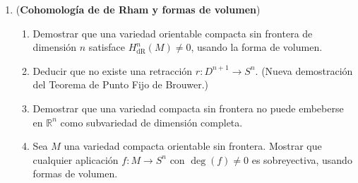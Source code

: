 \documentclass[11pt,a4paper]{article}
\theoremstyle{plain}
\theoremstyle{definition}
\theoremstyle{remark}
\newcommand{\RR}{\mathbb R}
\begin{document}
\begin{enumerate}[label=\arabic*.,leftmargin=*]
\noindent\textbf{Solución.}
\begin{enumerate}[label=\alph*)]
\item Si $k$ es un campo, $H^*(X\times Y;k)\cong H^*(X;k)\otimes_kH^*(Y;k)$
como álgebras graduadas.
\item Para $p\ne q$: $H^*(S^p\times S^q;k)\cong k[\alpha,\beta]/(\alpha^2,\beta^2)$
con $|\alpha|=p$, $|\beta|=q$. Como $p\ne q$, $\alpha\beta=(-1)^{pq}\beta\alpha$
y el álgebra es un álgebra exterior en dos generadores de distintos grados.
\item Para $p=q=n$: $H^*(S^n\times S^n;k)\cong k\oplus k^2\oplus k$ en
grados $0,n,2n$. El generador de $H^{2n}$ es $\alpha\otimes\beta$
(producto de los generadores de cada factor). En cambio,
$H^*(S^{2n}\vee S^n\vee S^n;k)$ tiene producto nulo en grados positivos,
así los anillos no son isomorfos.
\item $\Delta^*(\alpha\otimes1)=\Delta^*(1\otimes\alpha)=\alpha$
(generador de $H^n(S^n;k)$). En particular
$\Delta^*(\alpha\otimes\beta)=\alpha^2$ ($=0$ si $n$ impar, o
$=\alpha^2$ si $n$ par). La inclusión en el primer factor
$i_1:S^n\to S^n\times S^n$ satisface $i_1^*(1\otimes\beta)=0$, mientras
que $\Delta^*(1\otimes\beta)=\alpha\ne0$. Luego $\Delta^*\ne i_1^*$ como
homomorfismos de anillos, de modo que $\Delta\not\simeq i_1$ (y
análogamente para $i_2$).
\end{enumerate}

\item (\textbf{Cohomología de de Rham y formas de volumen})
\begin{enumerate}[label=\alph*)]
\item Demostrar que una variedad orientable compacta sin frontera de
dimensión $n$ satisface $H^n_{\mathrm{dR}}(M)\ne0$, usando la forma de
volumen.
\item Deducir que no existe una retracción $r:D^{n+1}\to S^n$. (Nueva
demostración del Teorema de Punto Fijo de Brouwer.)
\item Demostrar que una variedad compacta sin frontera no puede embeberse
en $\RR^n$ como subvariedad de dimensión completa.
\item Sea $M$ una variedad compacta orientable sin frontera. Mostrar que
cualquier aplicación $f:M\to S^n$ con $\deg(f)\ne0$ es sobreyectiva, usando
formas de volumen.
\end{enumerate}


\end{enumerate}
\end{document}
